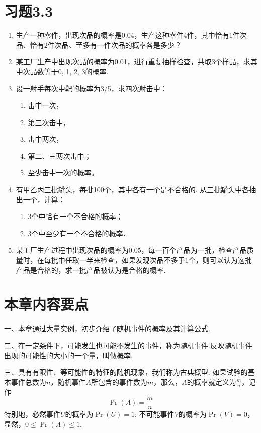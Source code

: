\section*{习题3.3}
\begin{enumerate}
    \item 生产一种零件，出现次品的概率是0.04，生产这种零件4件，其中恰有1件次品、恰有2件次品、至多有一件次品的概率各是多少？
    \item 某工厂生产中出现次品的概率为0.01，进行重复抽样检查，共取3个样品，求其中次品数等于0, 1, 2, 3的概率.
    \item 设一射手每次中靶的概率为3/5，求四次射击中：
\begin{multicols}{2}
\begin{enumerate}[(1)]
\item 击中一次，    \item 第三次击中，
\item 击中两次，    \item 第二、三两次击中；
\item 至少击中一次的概率。
\end{enumerate}    
\end{multicols}
    \item 有甲乙丙三批罐头，每批100个，其中各有一个是不合格的. 从三批罐头中各抽出一个，计算：
\begin{enumerate}[(1)]
  \item 3个中恰有一个不合格的概率；
\item 3个中至少有一个不合格的概率． 
\end{enumerate}
    \item 某工厂生产过程中出现次品的概率为0.05，每一百个产品为一批，检查产品质量时，在每批中任取一半来检查，如果发现次品不多于1个，则可以认为这批产品是合格的，求一批产品被认为是合格的概率.
\end{enumerate}

\section*{本章内容要点}
一、本章通过大量实例，初步介绍了随机事件的概率及其计算公式.

二、在一定条件下，可能发生也可能不发生的事件，称为随机事件.反映随机事件出现的可能性的大小的一个量，叫做概率.

三、具有有限性、等可能性的特征的随机现象，我们称为古典概型. 如果试验的基本事件总数为$n$，随机事件$A$所包含的事件数为$m$，那么，$A$的概率就定义为$\frac{m}{n}$，记作
\[\Pr(A)=\frac{m}{n}\]
特别地，必然事件$U$的概率为$\Pr(U)=1$; 不可能事件$V$的概率为$\Pr(V)=0$，显然，$0\le \Pr(A)\le 1$.

